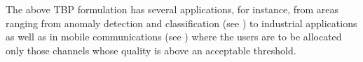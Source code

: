 

The above TBP formulation has several applications, for instance, from areas ranging from anomaly detection and classification (see  \citet{locatelli2016optimal}) to industrial applications as well as in mobile communications (see \citet{audibert2010best})  where the users are to be allocated only those channels whose quality is above an acceptable threshold.